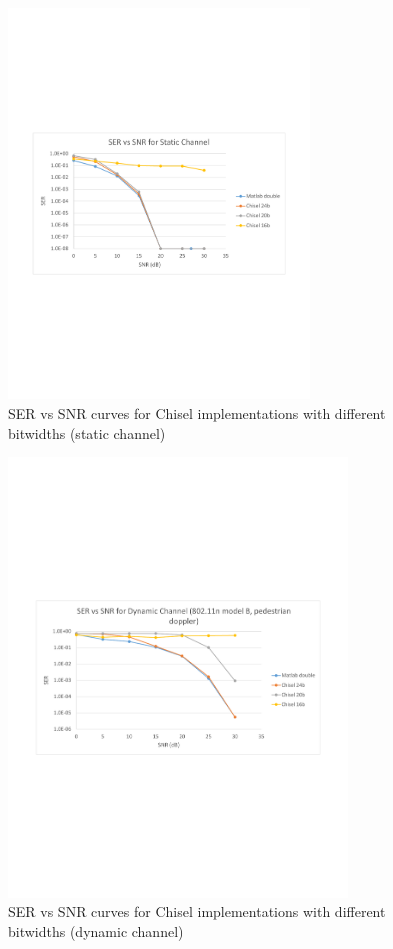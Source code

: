 \documentclass[journal]{IEEEtran}
\begin{document}
\begin{figure}[!h]
\centering
\includegraphics*[width=8cm, viewport = 80 260 560 530]{images/snr_ber_curves_chisel_static.pdf}
\caption{SER vs SNR curves for Chisel implementations with different bitwidths (static channel)}
\label{ser_ber_chisel_static}
\end{figure}

\begin{figure}[!h]
\centering
\includegraphics*[width=9cm, viewport = 80 270 560 530]{images/snr_ber_curves_chisel_doppler.pdf}
\caption{SER vs SNR curves for Chisel implementations with different bitwidths (dynamic channel)}
\label{ser_ber_chisel_dynamic}
\end{figure}
\end{document}
